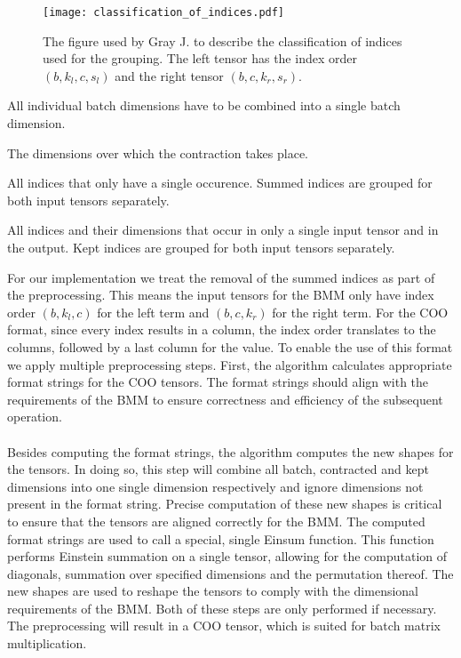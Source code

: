 \begin{figure}[H]
    \centering
    \texttt{[image: classification\_of\_indices.pdf]}
    \caption{The figure used by Gray J. \cite{jcmgray}  to describe the classification of indices
        used for the grouping. The left tensor has the index order $(b, k_l, c, s_l)$ and the right
        tensor $(b, c, k_r, s_r)$.}
    \label{fig:bmm:template}
\end{figure}
%
\begin{description}[leftmargin=!,labelwidth=\widthof{\bfseries Contracted Indices (c)}]
    \item [Batch Indices (b)] All individual batch dimensions have to be combined into a single
          batch dimension.
    \item [Contracted Indices (c)] The dimensions over which the contraction takes place.
    \item [Summed Indices (s)] All indices that only have a single occurence. Summed indices are
          grouped for both input tensors separately.
    \item [Kept Indices (k)] All indices and their dimensions that occur in only a single input
          tensor and in the output. Kept indices are grouped for both input tensors separately.
\end{description}
%
For our implementation we treat the removal of the summed indices as part of the preprocessing.
This means the input tensors for the BMM only have index order $(b, k_l, c)$ for the left term and
$(b, c, k_r)$ for the right term. For the COO format, since every index results in a column,
the index order translates to the columns, followed by a last column for the value. To enable the use
of this format we apply multiple preprocessing steps. First, the algorithm calculates appropriate
format strings for the COO tensors. The format strings should align with the requirements of the BMM
to ensure correctness and efficiency of the subsequent operation.
\\
\\
Besides computing the format strings, the algorithm computes the new shapes for the tensors.
In doing so, this step will combine all batch, contracted and kept dimensions into one single dimension
respectively and ignore dimensions not present in the format string. Precise computation of these new
shapes is critical to ensure that the tensors are aligned correctly for the BMM. The computed format strings are used to call a special, single Einsum function. This function performs
Einstein summation on a single tensor, allowing for the computation of diagonals, summation over
specified dimensions and the permutation thereof. The new shapes are used to reshape the tensors to
comply with the dimensional requirements of the BMM. Both of these steps are only performed if necessary.
The preprocessing will result in a COO tensor, which is suited for batch matrix multiplication.

